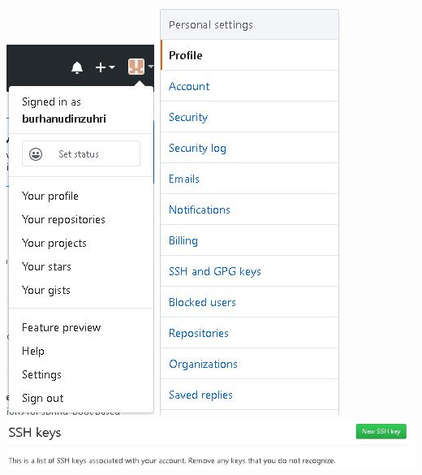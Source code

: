 \documentclass{article}
\newcounter{saveenumi}
\newcommand{\seti}{\setcounter{saveenumi}{\value{enumi}}} %
\begin{document}
\begin{enumerate}
                \includegraphics[scale=0.5]{32.3d.jpg}
                \includegraphics[scale=0.45]{32.3e.jpg}
                \newline
                \includegraphics[scale=0.5]{32.3f.jpg}
                \newline
             \seti %
        \end{enumerate}
\end{document}
